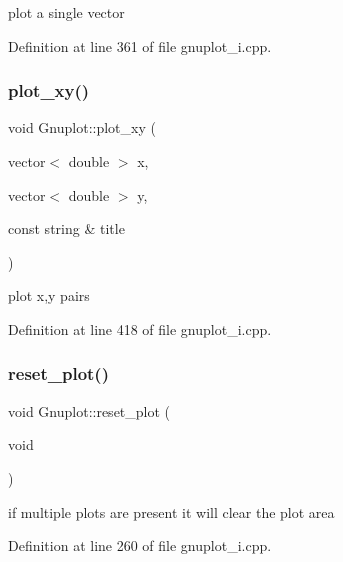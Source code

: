 plot a single vector 



Definition at line 361 of file gnuplot\+\_\+i.\+cpp.

\mbox{\label{class_gnuplot_a1e817a58ef3e40ceaeb128c7e6437e8a}} 
\subsubsection{\texorpdfstring{plot\+\_\+xy()}{plot\_xy()}}
{\footnotesize\ttfamily void Gnuplot\+::plot\+\_\+xy (\begin{DoxyParamCaption}\item[{vector$<$ double $>$}]{x,  }\item[{vector$<$ double $>$}]{y,  }\item[{const string \&}]{title }\end{DoxyParamCaption})}



plot x,y pairs 



Definition at line 418 of file gnuplot\+\_\+i.\+cpp.

\mbox{\label{class_gnuplot_ad54976652afe30231a850dd31e1ca70f}} 
\subsubsection{\texorpdfstring{reset\+\_\+plot()}{reset\_plot()}}
{\footnotesize\ttfamily void Gnuplot\+::reset\+\_\+plot (\begin{DoxyParamCaption}\item[{void}]{ }\end{DoxyParamCaption})}



if multiple plots are present it will clear the plot area 



Definition at line 260 of file gnuplot\+\_\+i.\+cpp.

\mbox{\label{class_gnuplot_accdd7b69237ead4109c74e1e440c185f}} 
